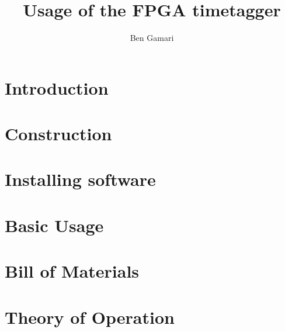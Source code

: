 \documentclass{report}
\begin{document}
\title{Usage of the FPGA timetagger}
\author{Ben Gamari}
\maketitle

\chapter{Introduction}


\chapter{Construction}
\label{Ch:Construction}


\chapter{Installing software}
\label{Ch:Installing}


\chapter{Basic Usage}
\label{Ch:BasicUsage}


%

\appendix
\chapter{Bill of Materials}
\label{Ch:BoM}


\chapter{Theory of Operation}
\label{Ch:Theory}

\end{document}
